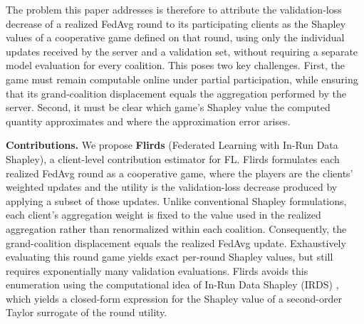 \documentclass[letterpaper]{article} %
\theoremstyle{definition} %
\begin{document}

The problem this paper addresses is therefore to attribute the validation-loss decrease of a realized FedAvg round to its participating clients as the Shapley values of a cooperative game defined on that round, using only the individual updates received by the server and a validation set, without requiring a separate model evaluation for every coalition. This poses two key challenges. First, the game must remain computable online under partial participation, while ensuring that its grand-coalition displacement equals the aggregation performed by the server. Second, it must be clear which game's Shapley value the computed quantity approximates and where the approximation error arises.



\noindent\textbf{Contributions.} We propose \textbf{Flirds} (Federated Learning with In-Run Data Shapley), a
client-level contribution estimator for FL. Flirds formulates
each realized FedAvg round as a cooperative game, where the players are the
clients' weighted updates and the utility is the validation-loss decrease
produced by applying a subset of those updates. Unlike conventional Shapley
formulations, each client's aggregation weight is fixed to the value used in
the realized aggregation rather than renormalized within each coalition.
Consequently, the grand-coalition displacement equals the realized FedAvg 
update. Exhaustively evaluating this round game yields exact
per-round Shapley values, but still requires exponentially many validation
evaluations.  Flirds avoids this enumeration using the computational idea of
In-Run Data Shapley (IRDS) \citep{wang2025data}, which yields a closed-form expression for the
Shapley value of a second-order Taylor surrogate of the round utility.
\end{document}
